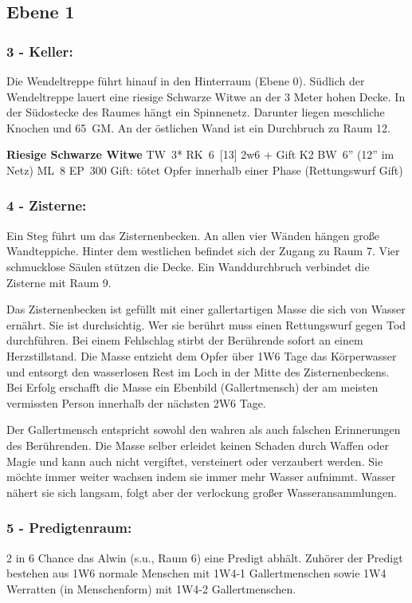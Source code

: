 \subsection{Ebene 1}

\subsubsection{3 - Keller:} Die Wendeltreppe führt hinauf in den Hinterraum
(Ebene 0). Südlich der Wendeltreppe lauert eine riesige Schwarze Witwe an der 3
Meter hohen Decke.  In der Südostecke des Raumes hängt ein Spinnenetz. Darunter
liegen meschliche Knochen und 65~GM. An der östlichen Wand ist ein Durchbruch
zu Raum 12.

\textbf{Riesige Schwarze Witwe} TW~3* RK~6~[13] 2w6 + Gift K2 BW~6'' (12''
im Netz) ML~8 EP~300 
Gift: tötet Opfer innerhalb einer Phase (Rettungswurf Gift)

\subsubsection{4 - Zisterne:} Ein Steg führt um das Zisternenbecken. An allen
vier Wänden hängen große Wandteppiche. Hinter dem westlichen befindet sich der
Zugang zu Raum 7. Vier schmucklose Säulen stützen die Decke. Ein Wanddurchbruch
verbindet die Zisterne mit Raum 9.


Das Zisternenbecken ist gefüllt mit einer gallertartigen Masse die sich von
Wasser ernährt. Sie ist durchsichtig. Wer sie berührt muss einen Rettungswurf
gegen Tod durchführen. Bei einem Fehlschlag stirbt der Berührende sofort an
einem Herzstillstand. Die Masse entzieht dem Opfer über 1W6 Tage das
Körperwasser und entsorgt den wasserlosen Rest im Loch in der Mitte des
Zisternenbeckens. Bei Erfolg erschafft die Masse ein Ebenbild (Gallertmensch)
der am meisten vermissten Person innerhalb der nächsten 2W6 Tage.

Der Gallertmensch entspricht sowohl den wahren als auch falschen Erinnerungen
des Berührenden.  Die Masse selber erleidet keinen Schaden durch Waffen oder
Magie und kann auch nicht vergiftet, versteinert oder verzaubert werden. Sie
möchte immer weiter wachsen indem sie immer mehr Wasser aufnimmt. Wasser nähert
sie sich langsam, folgt aber der verlockung großer Wasseransammlungen.

\subsubsection{5 - Predigtenraum:} 2 in 6 Chance das Alwin (s.u., Raum 6) eine
Predigt abhält. Zuhörer der Predigt bestehen aus 1W6 normale Menschen mit 1W4-1
Gallertmenschen sowie 1W4 Werratten (in Menschenform) mit 1W4-2
Gallertmenschen.

